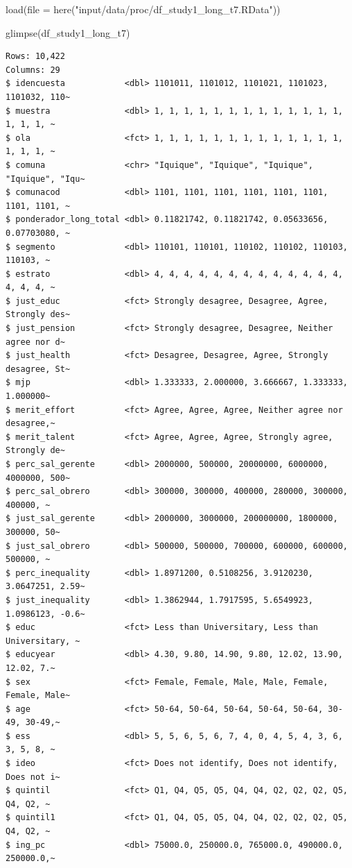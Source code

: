 \documentclass[
  12pt,
  letterpaper,
  DIV=11,
  numbers=noendperiod]{scrartcl}
\newenvironment{Shaded}{\begin{snugshade}}{\end{snugshade}}
\newcommand{\AttributeTok}[1]{\textcolor[rgb]{0.40,0.45,0.13}{#1}}
\newcommand{\FunctionTok}[1]{\textcolor[rgb]{0.28,0.35,0.67}{#1}}
\newcommand{\NormalTok}[1]{\textcolor[rgb]{0.00,0.23,0.31}{#1}}
\newcommand{\StringTok}[1]{\textcolor[rgb]{0.13,0.47,0.30}{#1}}
\begin{document}
\begin{Shaded}
\begin{Highlighting}[]
\FunctionTok{load}\NormalTok{(}\AttributeTok{file =} \FunctionTok{here}\NormalTok{(}\StringTok{"input/data/proc/df\_study1\_long\_t7.RData"}\NormalTok{))}

\FunctionTok{glimpse}\NormalTok{(df\_study1\_long\_t7)}
\end{Highlighting}
\end{Shaded}

\begin{verbatim}
Rows: 10,422
Columns: 29
$ idencuesta            <dbl> 1101011, 1101012, 1101021, 1101023, 1101032, 110~
$ muestra               <dbl> 1, 1, 1, 1, 1, 1, 1, 1, 1, 1, 1, 1, 1, 1, 1, 1, ~
$ ola                   <fct> 1, 1, 1, 1, 1, 1, 1, 1, 1, 1, 1, 1, 1, 1, 1, 1, ~
$ comuna                <chr> "Iquique", "Iquique", "Iquique", "Iquique", "Iqu~
$ comunacod             <dbl> 1101, 1101, 1101, 1101, 1101, 1101, 1101, 1101, ~
$ ponderador_long_total <dbl> 0.11821742, 0.11821742, 0.05633656, 0.07703080, ~
$ segmento              <dbl> 110101, 110101, 110102, 110102, 110103, 110103, ~
$ estrato               <dbl> 4, 4, 4, 4, 4, 4, 4, 4, 4, 4, 4, 4, 4, 4, 4, 4, ~
$ just_educ             <fct> Strongly desagree, Desagree, Agree, Strongly des~
$ just_pension          <fct> Strongly desagree, Desagree, Neither agree nor d~
$ just_health           <fct> Desagree, Desagree, Agree, Strongly desagree, St~
$ mjp                   <dbl> 1.333333, 2.000000, 3.666667, 1.333333, 1.000000~
$ merit_effort          <fct> Agree, Agree, Agree, Neither agree nor desagree,~
$ merit_talent          <fct> Agree, Agree, Agree, Strongly agree, Strongly de~
$ perc_sal_gerente      <dbl> 2000000, 500000, 20000000, 6000000, 4000000, 500~
$ perc_sal_obrero       <dbl> 300000, 300000, 400000, 280000, 300000, 400000, ~
$ just_sal_gerente      <dbl> 2000000, 3000000, 200000000, 1800000, 300000, 50~
$ just_sal_obrero       <dbl> 500000, 500000, 700000, 600000, 600000, 500000, ~
$ perc_inequality       <dbl> 1.8971200, 0.5108256, 3.9120230, 3.0647251, 2.59~
$ just_inequality       <dbl> 1.3862944, 1.7917595, 5.6549923, 1.0986123, -0.6~
$ educ                  <fct> Less than Universitary, Less than Universitary, ~
$ educyear              <dbl> 4.30, 9.80, 14.90, 9.80, 12.02, 13.90, 12.02, 7.~
$ sex                   <fct> Female, Female, Male, Male, Female, Female, Male~
$ age                   <fct> 50-64, 50-64, 50-64, 50-64, 50-64, 30-49, 30-49,~
$ ess                   <dbl> 5, 5, 6, 5, 6, 7, 4, 0, 4, 5, 4, 3, 6, 3, 5, 8, ~
$ ideo                  <fct> Does not identify, Does not identify, Does not i~
$ quintil               <fct> Q1, Q4, Q5, Q5, Q4, Q4, Q2, Q2, Q2, Q5, Q4, Q2, ~
$ quintil1              <fct> Q1, Q4, Q5, Q5, Q4, Q4, Q2, Q2, Q2, Q5, Q4, Q2, ~
$ ing_pc                <dbl> 75000.0, 250000.0, 765000.0, 490000.0, 250000.0,~
\end{verbatim}
\end{document}
